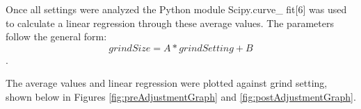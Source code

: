 \documentclass[10pt,a4paper,twocolumn,notitlepage]{article}
\begin{document}
Once all settings were analyzed the Python module Scipy.curve\_ fit[6] was used to calculate a linear regression through these average values. The parameters follow the general form: $$grindSize = A*grindSetting + B$$.

\begin{center}
\begin{table}[h]
\end{table}
\end{center}

The average values and linear regression were plotted against grind setting, shown below in Figures \ref{fig:preAdjustmentGraph} and \ref{fig:postAdjustmentGraph}.\\
\end{document}
